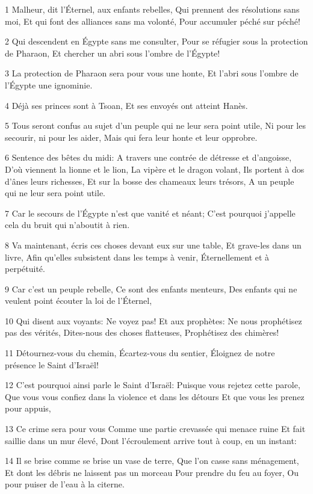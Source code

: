 \par 1 Malheur, dit l'Éternel, aux enfants rebelles, Qui prennent des résolutions sans moi, Et qui font des alliances sans ma volonté, Pour accumuler péché sur péché!
\par 2 Qui descendent en Égypte sans me consulter, Pour se réfugier sous la protection de Pharaon, Et chercher un abri sous l'ombre de l'Égypte!
\par 3 La protection de Pharaon sera pour vous une honte, Et l'abri sous l'ombre de l'Égypte une ignominie.
\par 4 Déjà ses princes sont à Tsoan, Et ses envoyés ont atteint Hanès.
\par 5 Tous seront confus au sujet d'un peuple qui ne leur sera point utile, Ni pour les secourir, ni pour les aider, Mais qui fera leur honte et leur opprobre.
\par 6 Sentence des bêtes du midi: A travers une contrée de détresse et d'angoisse, D'où viennent la lionne et le lion, La vipère et le dragon volant, Ils portent à dos d'ânes leurs richesses, Et sur la bosse des chameaux leurs trésors, A un peuple qui ne leur sera point utile.
\par 7 Car le secours de l'Égypte n'est que vanité et néant; C'est pourquoi j'appelle cela du bruit qui n'aboutit à rien.
\par 8 Va maintenant, écris ces choses devant eux sur une table, Et grave-les dans un livre, Afin qu'elles subsistent dans les temps à venir, Éternellement et à perpétuité.
\par 9 Car c'est un peuple rebelle, Ce sont des enfants menteurs, Des enfants qui ne veulent point écouter la loi de l'Éternel,
\par 10 Qui disent aux voyants: Ne voyez pas! Et aux prophètes: Ne nous prophétisez pas des vérités, Dites-nous des choses flatteuses, Prophétisez des chimères!
\par 11 Détournez-vous du chemin, Écartez-vous du sentier, Éloignez de notre présence le Saint d'Israël!
\par 12 C'est pourquoi ainsi parle le Saint d'Israël: Puisque vous rejetez cette parole, Que vous vous confiez dans la violence et dans les détours Et que vous les prenez pour appuis,
\par 13 Ce crime sera pour vous Comme une partie crevassée qui menace ruine Et fait saillie dans un mur élevé, Dont l'écroulement arrive tout à coup, en un instant:
\par 14 Il se brise comme se brise un vase de terre, Que l'on casse sans ménagement, Et dont les débris ne laissent pas un morceau Pour prendre du feu au foyer, Ou pour puiser de l'eau à la citerne.
